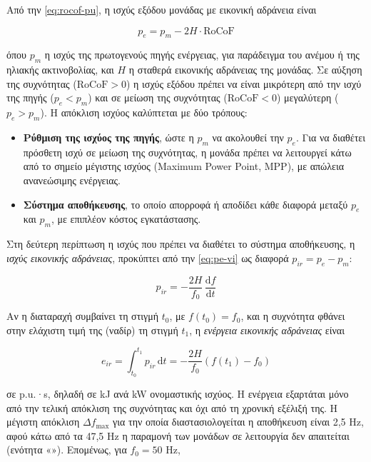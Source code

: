 Από την \eqref{eq:rocof-pu}, η ισχύς εξόδου μονάδας με εικονική αδράνεια είναι

\begin{equation}
p_e = p_m - 2H \cdot \mathrm{RoCoF}
\label{eq:pe-vi}
\end{equation}

όπου $p_m$ η ισχύς της πρωτογενούς πηγής ενέργειας, για παράδειγμα του ανέμου ή της ηλιακής
ακτινοβολίας, και $H$ η σταθερά εικονικής αδράνειας της μονάδας. Σε αύξηση της συχνότητας
($\mathrm{RoCoF} > 0$) η ισχύς εξόδου πρέπει να είναι μικρότερη από την ισχύ της πηγής
($p_e < p_m$) και σε μείωση της συχνότητας ($\mathrm{RoCoF} < 0$) μεγαλύτερη ($p_e > p_m$).
Η απόκλιση ισχύος καλύπτεται με δύο τρόπους:

\begin{itemize}
\item \textbf{Ρύθμιση της ισχύος της πηγής}, ώστε η $p_m$ να ακολουθεί την $p_e$. Για να
      διαθέτει πρόσθετη ισχύ σε μείωση της συχνότητας, η μονάδα πρέπει να λειτουργεί κάτω από
      το σημείο μέγιστης ισχύος (Maximum Power Point, MPP), με απώλεια ανανεώσιμης ενέργειας.
\item \textbf{Σύστημα αποθήκευσης}, το οποίο απορροφά ή αποδίδει κάθε διαφορά μεταξύ $p_e$ και
      $p_m$, με επιπλέον κόστος εγκατάστασης.
\end{itemize}

Στη δεύτερη περίπτωση η ισχύς που πρέπει να διαθέτει το σύστημα αποθήκευσης, η \emph{ισχύς
εικονικής αδράνειας}, προκύπτει από την \eqref{eq:pe-vi} ως διαφορά $p_{ir} = p_e - p_m$:

\begin{equation}
p_{ir} = -\frac{2H}{f_0}\,\frac{\mathrm{d}f}{\mathrm{d}t}
\label{eq:pir}
\end{equation}

Αν η διαταραχή συμβαίνει τη στιγμή $t_0$, με $f(t_0) = f_0$, και η συχνότητα φθάνει στην
ελάχιστη τιμή της (ναδίρ) τη στιγμή $t_1$, η \emph{ενέργεια εικονικής αδράνειας} είναι

\begin{equation}
e_{ir} = \int_{t_0}^{t_1} p_{ir}\,\mathrm{d}t = -\frac{2H}{f_0}\left(f(t_1) - f_0\right)
\label{eq:eir}
\end{equation}

σε p.u.·s, δηλαδή σε kJ ανά kW ονομαστικής ισχύος. Η ενέργεια εξαρτάται μόνο από την τελική
απόκλιση της συχνότητας και όχι από τη χρονική εξέλιξή της. Η μέγιστη απόκλιση
$\Delta f_{\max}$ για την οποία διαστασιολογείται η αποθήκευση είναι 2,5 Hz, αφού κάτω από τα
47,5 Hz η παραμονή των μονάδων σε λειτουργία δεν απαιτείται (ενότητα
«»). Επομένως, για $f_0 = 50$ Hz,

